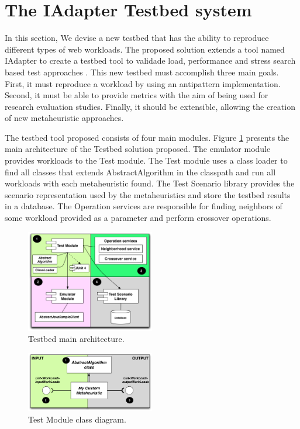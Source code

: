 
\vspace*{-.075in}
\section{The IAdapter Testbed system}\label{sec:technique}
\vspace*{-.075in}


In this section, We devise a new testbed that has the ability to reproduce different types of web workloads.  The proposed solution extends a tool named IAdapter to create a testbed tool to validade load, performance and stress search based test approaches \cite{Gois2016}. This new testbed must accomplish three main goals. First, it must reproduce a workload by using an antipattern implementation. Second, it must be able to provide metrics with the aim of being used for research evaluation studies. Finally, it should be extensible, allowing the creation of new metaheuristic approaches.

The testbed tool proposed consists of four main modules.  Figure \ref{fig:testbedarch} presents the main architecture of the Testbed solution proposed. The emulator module provides workloads to the Test module. The Test module uses a class loader to find all classes that extends AbstractAlgorithm in the classpath and run all workloads with each metaheuristic found. The Test Scenario library provides the scenario representation used by the metaheuristics and store the testbed results in a database. The Operation services are responsible for finding neighbors of some workload provided as a parameter and perform crossover operations.

\begin{figure}[h]
\centering
\includegraphics[width=0.5\textwidth]{./images/testbedarch.png}
\caption{Testbed main architecture.}
\label{fig:testbedarch}
\end{figure} 

\begin{figure}[h]
\centering
\includegraphics[width=0.5\textwidth]{./images/myheuristic.png}
\caption{Test Module class diagram.}
\label{fig:heuristicclassdiagram}
\end{figure} 



